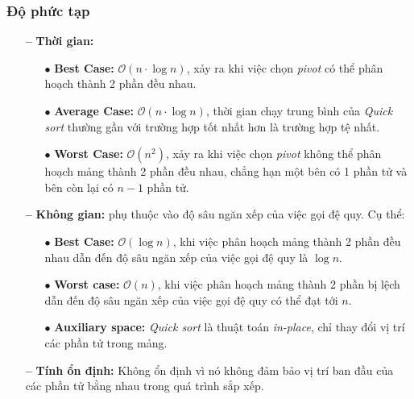 \subsubsection{Độ phức tạp} 
\begin{itemize}
    \item[\textbf{--}]\textbf{Thời gian:}
        \begin{itemize}
            \item[$\bullet$] \textbf{Best Case:} $\mathcal{O}(n \cdot \log{}n)$, xảy ra khi việc chọn \textit{pivot} có thể phân hoạch thành 2 phần đều nhau.
            \item[$\bullet$] \textbf{Average Case:}  $\mathcal{O}(n \cdot \log{}n)$, thời gian chạy trung bình của \textit{Quick sort} thường gần với trường hợp tốt nhất hơn là trường hợp tệ nhất. \cite{CLRS2009} 
            \item[$\bullet$] \textbf{Worst Case:}  $\mathcal{O}(n^{2})$, xảy ra khi việc chọn \textit{pivot} không thể phân hoạch mảng thành 2 phần đều nhau, chẳng hạn một bên có 1 phần tử và bên còn lại có $n - 1$ phần tử.
        \end{itemize}
    \item[\textbf{--}]\textbf{Không gian:} phụ thuộc vào độ sâu ngăn xếp của việc gọi đệ quy. Cụ thể:
        \begin{itemize}
            \item[$\bullet$] \textbf{Best Case:} $\mathcal{O}(\log{}n)$, khi việc phân hoạch mảng thành 2 phần đều nhau dẫn đến độ sâu ngăn xếp của việc gọi đệ quy là $\log{}n$.
            \item[$\bullet$] \textbf{Worst case:} $\mathcal{O}(n)$, khi việc phân hoạch mảng thành 2 phần bị lệch dẫn đến độ sâu ngăn xếp của việc gọi đệ quy có thể đạt tới $n$. 
            \item[$\bullet$] \textbf{Auxiliary space:} \textit{Quick sort} là thuật toán \textit{in-place}, chỉ thay đổi vị trí các phần tử trong mảng.
        \end{itemize}
    \item[\textbf{--}]\textbf{Tính ổn định:} Không ổn định vì nó không đảm bảo vị trí ban đầu của các phần tử bằng nhau trong quá trình sắp xếp.
\end{itemize}